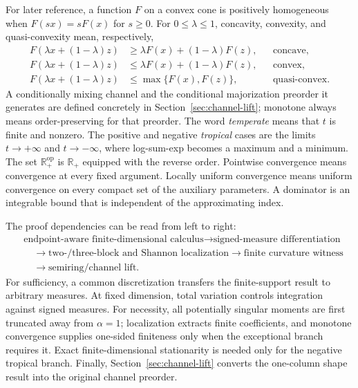 \documentclass[aps,pra,11pt,onecolumn,nofootinbib,tightenlines]{revtex4-2}
\theoremstyle{definition}
\begin{document}
For later reference, a function $F$ on a convex cone is positively homogeneous
when $F(sx)=sF(x)$ for $s\geq0$.  For $0\leq\lambda\leq1$, concavity,
convexity, and quasi-convexity mean, respectively,
\begin{equation}
 \begin{aligned}
 F(\lambda x+(1-\lambda)z)
 &\geq \lambda F(x)+(1-\lambda)F(z), &&\text{concave},\\
 F(\lambda x+(1-\lambda)z)
 &\leq \lambda F(x)+(1-\lambda)F(z), &&\text{convex},\\
 F(\lambda x+(1-\lambda)z)
 &\leq \max\{F(x),F(z)\}, &&\text{quasi-convex}.
 \end{aligned}
 \label{eq:shape-definitions-standing}
\end{equation}
A conditionally mixing channel and the conditional
majorization preorder it generates are defined concretely in
Section~\ref{sec:channel-lift}; monotone always means order-preserving for that
preorder.  The word \emph{temperate} means that $t$ is finite and nonzero.  The
positive and negative \emph{tropical} cases are the limits
$t\to+\infty$ and $t\to-\infty$, where log-sum-exp becomes a maximum and a
minimum.  The set $\mathbb R_+^{\mathrm{op}}$ is $\mathbb R_+$ equipped with
the reverse order.  Pointwise convergence means convergence at every fixed
argument.  Locally uniform convergence means uniform convergence on every
compact set of the auxiliary parameters.  A dominator is an integrable bound
that is independent of the approximating index.

The proof dependencies can be read from left to right:
\[
\begin{aligned}
&\text{endpoint-aware finite-dimensional calculus}
\longrightarrow \text{signed-measure differentiation}\\
&\quad\longrightarrow \text{two-/three-block and Shannon localization}
\longrightarrow \text{finite curvature witness}\\
&\quad\longrightarrow \text{semiring/channel lift}.
\end{aligned}
\]
For sufficiency, a common discretization transfers the finite-support result to
arbitrary measures.  At fixed dimension, total variation controls integration
against signed measures.  For necessity, all potentially singular moments are
first truncated away from $\alpha=1$; localization extracts finite coefficients,
and monotone convergence supplies one-sided finiteness only when the exceptional
branch requires it.  Exact finite-dimensional stationarity is needed only for
the negative tropical branch.  Finally, Section~\ref{sec:channel-lift} converts
the one-column shape result into the original channel preorder.
\end{document}
